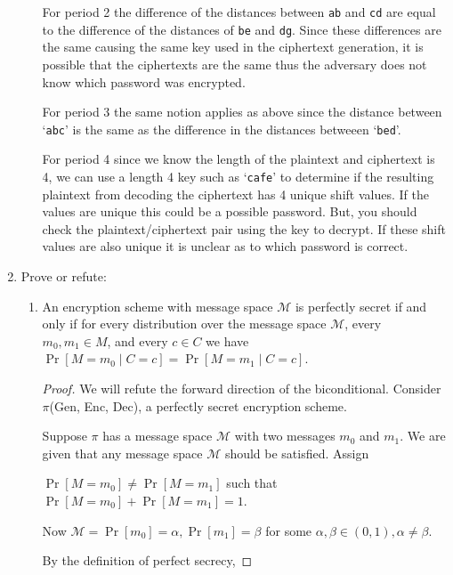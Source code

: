 \documentclass{article}
\begin{document}
\begin{enumerate}
\begin{enumerate}
        For period 2 the difference of the distances between \verb|ab| and \verb|cd| are equal to the difference of the distances of \verb|be| and \verb|dg|. Since these differences are the same causing the same key used in the ciphertext generation,  it is possible that the ciphertexts are the same thus the adversary does not know which password was encrypted. 

       
        For period 3 the same notion applies as above since the distance between `\verb|abc|' is the same as the difference in the distances betweeen `\verb|bed|'.


        For period 4 since we know the length of the plaintext and ciphertext is 4, we can use a length 4 key such as `\verb|cafe|' to determine if the resulting plaintext from decoding the ciphertext has 4 unique shift values. If the values are unique this could be a possible password. But, you should check the plaintext/ciphertext pair using the key to decrypt. If these shift values are also unique it is unclear as to which password is correct. 
    \end{enumerate}
  \item Prove or refute:
    \begin{enumerate}
      \item An encryption scheme with message space $\mathcal{M}$ is perfectly
        secret if and only if for every distribution over the message space 
        $\mathcal{M}$, every $m_0, m_1 \in M$, and every $c \in C$ we have 
        $\Pr\left[M = m_0 \mid C = c\right] = \Pr\left[M = m_1 \mid C = c\right]$.

        \begin{proof}
        We will refute the forward direction of the biconditional. Consider $\pi$(Gen, Enc, Dec), a perfectly secret encryption scheme. \newline

        Suppose $\pi$ has a message space $\mathcal{M}$ with two messages $m_0$ and $m_1$. We are given that any message space $\mathcal{M}$ should be satisfied. Assign
        
        $\Pr[M = m_0] \neq \Pr[M = m_1]$ such that $\Pr[M = m_0] + \Pr[M = m_1] = 1$.\newline

        Now $\mathcal{M} = \Pr[m_0] = \alpha, \Pr[m_1] = \beta$ for some $\alpha, \beta \in (0, 1), \alpha \neq \beta$. \newline

        By the definition of perfect secrecy,


\end{proof}
\end{enumerate}
\end{enumerate}
\end{document}
